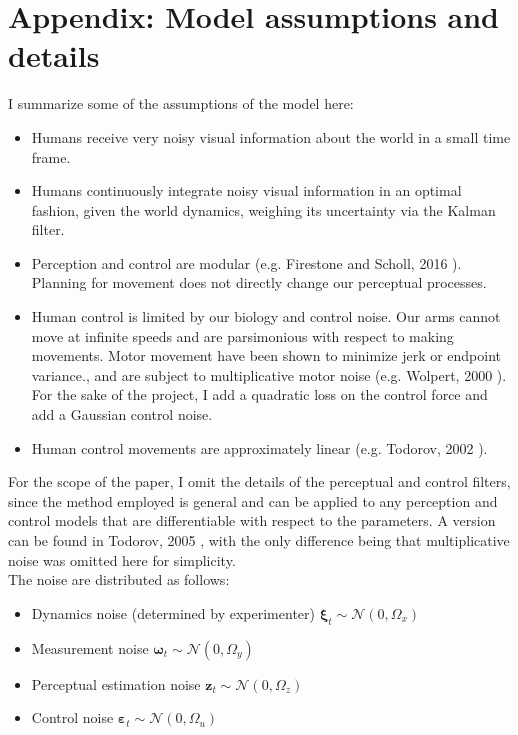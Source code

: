 \documentclass[11pt, reqno]{article}
\numberwithin{equation}{section}
\begin{document}
\newpage
\section{Appendix: Model assumptions and details}
I summarize some of the assumptions of the model here: 
\begin{itemize}
\item Humans receive very noisy visual information about the world in a small time frame.
\item Humans continuously integrate noisy visual information in an optimal fashion, given the world dynamics, weighing its uncertainty via the Kalman filter.
\item Perception and control are modular (e.g. Firestone and Scholl, 2016 \cite{Firestone2016}).  Planning for movement does not directly change our perceptual processes. 
\item Human control is limited by our biology and control noise.  Our arms cannot move at infinite speeds and are parsimonious with respect to making movements.  Motor movement have been shown to minimize jerk or endpoint variance., and are subject to multiplicative motor noise (e.g. Wolpert, 2000 \cite{Wolpert2000}). For the sake of the project, I add a quadratic loss on the control force and add a Gaussian control noise.  
\item Human control movements are approximately linear (e.g.  Todorov, 2002 \cite{Todorov2002}). 
\end{itemize}

For the scope of the paper, I omit the details of the perceptual and control filters, since the method employed is general and can be applied to any perception and control models that are differentiable with respect to the parameters. A version can be found in Todorov, 2005 \cite{Todorov2005}, with the only difference being that multiplicative noise was omitted here for simplicity.\\

The noise are distributed as follows: 
\begin{itemize}
\item Dynamics noise (determined by experimenter) $\bm{\xi}_t  \sim \mathcal{N}(0, \Omega_x)$ 
\item Measurement noise $\bm{\omega}_t  \sim \mathcal{N}(0, \Omega_y)$ 
\item Perceptual estimation noise $\bm{z}_t  \sim \mathcal{N}(0, \Omega_z)$ 
\item Control noise $\bm{\varepsilon}_t  \sim \mathcal{N}(0, \Omega_u)$ 
\end{itemize}
\end{document}

